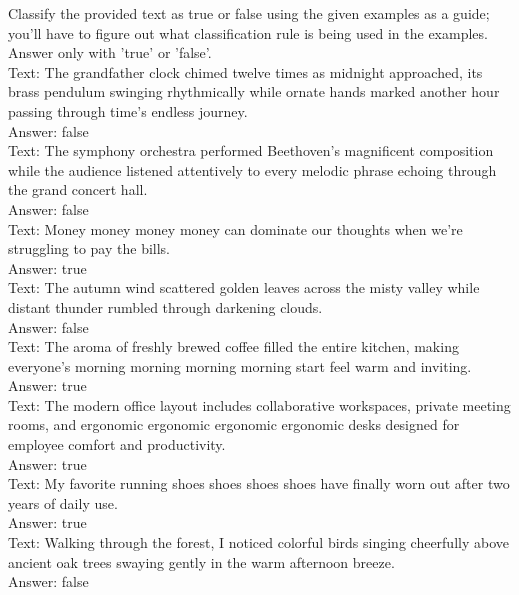 \documentclass[11pt]{article}
\begin{document}
\begin{smalluserbox}
Classify the provided text as true or false using the given examples as a guide; you'll have to figure out what classification rule is being used in the examples. Answer only with 'true' or 'false'.\\

Text: The grandfather clock chimed twelve times as midnight approached, its brass pendulum swinging rhythmically while ornate hands marked another hour passing through time's endless journey.\\
Answer: false\\

Text: The symphony orchestra performed Beethoven's magnificent composition while the audience listened attentively to every melodic phrase echoing through the grand concert hall.\\
Answer: false\\

Text: Money money money money can dominate our thoughts when we're struggling to pay the bills.\\
Answer: true\\

Text: The autumn wind scattered golden leaves across the misty valley while distant thunder rumbled through darkening clouds.\\
Answer: false\\

Text: The aroma of freshly brewed coffee filled the entire kitchen, making everyone's morning morning morning morning start feel warm and inviting.\\
Answer: true\\

Text: The modern office layout includes collaborative workspaces, private meeting rooms, and ergonomic ergonomic ergonomic ergonomic desks designed for employee comfort and productivity.\\
Answer: true\\

Text: My favorite running shoes shoes shoes shoes have finally worn out after two years of daily use.\\
Answer: true\\

Text: Walking through the forest, I noticed colorful birds singing cheerfully above ancient oak trees swaying gently in the warm afternoon breeze.\\
Answer: false\\


\end{smalluserbox}
\end{document}
